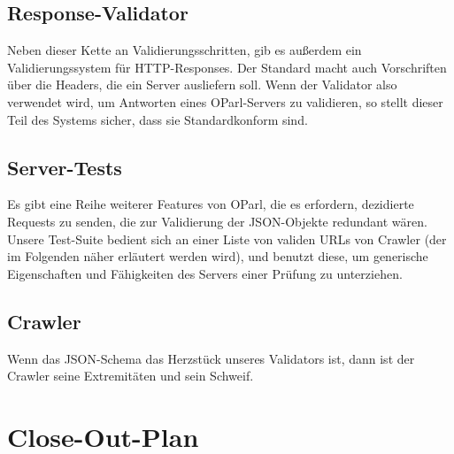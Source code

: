 \documentclass[12pt, fleqn]{scrartcl}
\begin{document}
\subsection{Response-Validator}

Neben dieser Kette an Validierungsschritten, gib es außerdem ein Validierungssystem für HTTP-Responses. Der Standard macht auch Vorschriften über die Headers, die ein Server ausliefern soll. Wenn der Validator also verwendet wird, um Antworten eines OParl-Servers zu validieren, so stellt dieser Teil des Systems sicher, dass sie Standardkonform sind.

\subsection{Server-Tests}

Es gibt eine Reihe weiterer Features von OParl, die es erfordern, dezidierte Requests zu senden, die zur Validierung der JSON-Objekte redundant wären. Unsere Test-Suite bedient sich an einer Liste von validen URLs von Crawler (der im Folgenden näher erläutert werden wird), und benutzt diese, um generische Eigenschaften und Fähigkeiten des Servers einer Prüfung zu unterziehen.

\subsection{Crawler}


Wenn das JSON-Schema das Herzstück unseres Validators ist, dann ist der Crawler seine Extremitäten und sein Schweif.



\section{Close-Out-Plan}


{}
\setlength\bibitemsep{0pt}
\printbibliography
\end{document}

